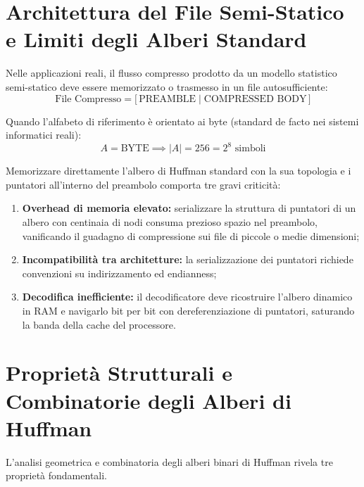 \FloatBarrier
\section{Architettura del File Semi-Statico e Limiti degli Alberi Standard}
\label{sec:architettura-semi-statico}

Nelle applicazioni reali, il flusso compresso prodotto da un modello statistico semi-statico deve essere memorizzato o trasmesso in un file autosufficiente:
\begin{equation}
  \text{File Compresso} = \big[ \, \text{PREAMBLE} \; \big\vert \; \text{COMPRESSED BODY} \, \big]
\end{equation}

Quando l'alfabeto di riferimento \`e orientato ai byte (standard de facto nei sistemi informatici reali):
\begin{equation}
  A = \text{BYTE} \implies \vert A \vert = 256 = 2^8\text{ simboli}
\end{equation}

Memorizzare direttamente l'albero di Huffman standard con la sua topologia e i puntatori all'interno del preambolo comporta tre gravi criticit\`a:
\begin{enumerate}
  \item \textbf{Overhead di memoria elevato:} serializzare la struttura di puntatori di un albero con centinaia di nodi consuma prezioso spazio nel preambolo, vanificando il guadagno di compressione sui file di piccole o medie dimensioni;
  \item \textbf{Incompatibilit\`a tra architetture:} la serializzazione dei puntatori richiede convenzioni su indirizzamento ed endianness;
  \item \textbf{Decodifica inefficiente:} il decodificatore deve ricostruire l'albero dinamico in RAM e navigarlo bit per bit con dereferenziazione di puntatori, saturando la banda della cache del processore.
\end{enumerate}

\FloatBarrier
\section{Propriet\`a Strutturali e Combinatorie degli Alberi di Huffman}
\label{sec:proprieta-strutturali-huffman}

L'analisi geometrica e combinatoria degli alberi binari di Huffman rivela tre propriet\`a fondamentali.

